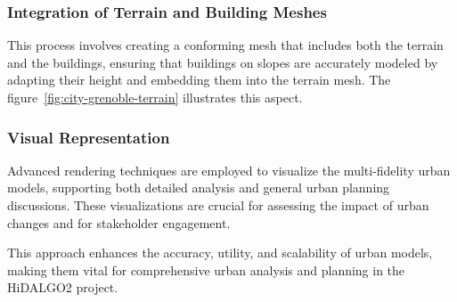 \documentclass[runningheads]{llncs}
\begin{document}
\subsubsection{Integration of Terrain and Building Meshes}
This process involves creating a conforming mesh that includes both the terrain and the buildings, ensuring that buildings on slopes are accurately modeled by adapting their height and embedding them into the terrain mesh. The figure~\ref{fig:city-grenoble-terrain} illustrates this aspect.

\subsubsection{Visual Representation}
Advanced rendering techniques are employed to visualize the multi-fidelity urban models, supporting both detailed analysis and general urban planning discussions. These visualizations are crucial for assessing the impact of urban changes and for stakeholder engagement.

This approach enhances the accuracy, utility, and scalability of urban models, making them vital for comprehensive urban analysis and planning in the HiDALGO2 project.
\end{document}
